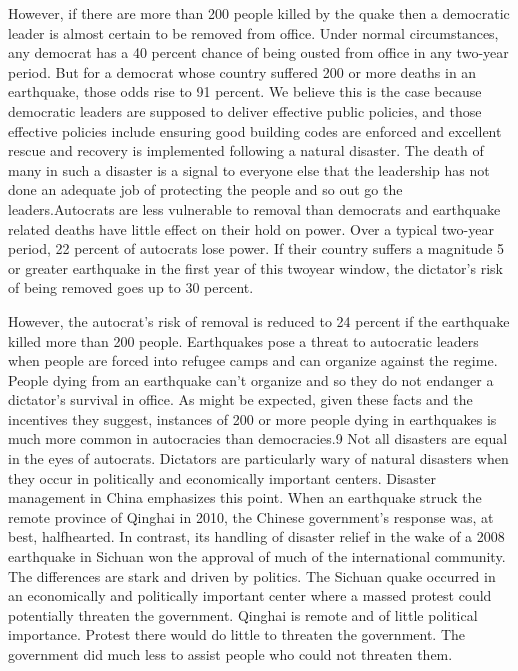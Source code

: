 \documentclass[10pt]{article}
\begin{document}
{\large However, if there are more than 200 people killed by the quake then a
democratic leader is almost certain to be removed from office. Under normal
circumstances, any democrat has a 40 percent chance of being ousted from office
in any two-year period. But for a democrat whose country suffered 200 or more
deaths in an earthquake, those odds rise to 91 percent. We believe this is the
case because democratic leaders are supposed to deliver effective public
policies, and those effective policies include ensuring good building codes are
enforced and excellent rescue and recovery is implemented following a natural
disaster. The death of many in such a disaster is a signal to everyone else that
the leadership has not done an adequate job of protecting the people and so out
go the leaders.Autocrats are less vulnerable to removal than democrats and
earthquake related deaths have little effect on their hold on power. Over a
typical two-year period, 22 percent of autocrats lose power. If their country
suffers a magnitude 5 or greater earthquake in the first year of this twoyear
window, the dictator's risk of being removed goes up to 30 percent.}

{\large However, the autocrat's risk of removal is reduced to 24 percent if the
earthquake killed more than 200 people. Earthquakes pose a threat to autocratic
leaders when people are forced into refugee camps and can organize against the
regime. People dying from an earthquake can't organize and so they do not
endanger a dictator's survival in office. As might be expected, given these facts
and the incentives they suggest, instances of 200 or more people dying in
earthquakes is much more common in autocracies than democracies.9 Not all
disasters are equal in the eyes of autocrats. Dictators are particularly wary of
natural disasters when they occur in politically and economically important
centers. Disaster management in China emphasizes this point. When an earthquake
struck the remote province of Qinghai in 2010, the Chinese government's response
was, at best, halfhearted. In contrast, its handling of disaster relief in the
wake of a 2008 earthquake in Sichuan won the approval of much of the
international community. The differences are stark and driven by politics. The
Sichuan quake occurred in an economically and politically important center where
a massed protest could potentially threaten the government. Qinghai is remote and
of little political importance. Protest there would do little to threaten the
government. The government did much less to assist people who could not threaten
them.}
\end{document}
